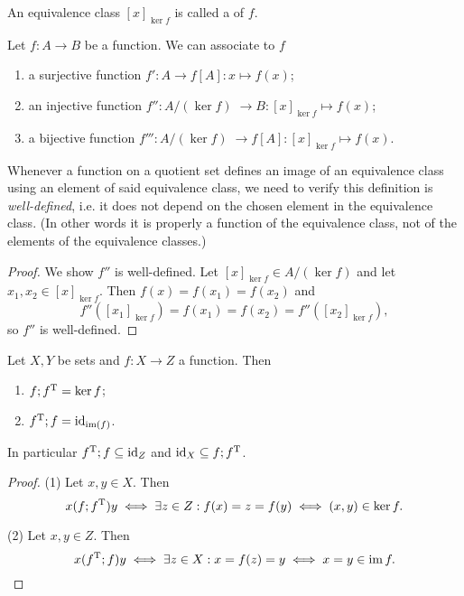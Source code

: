 \begin{definition}
An equivalence class $[x]_{\ker f}$ is called a  of $f$.
\end{definition}

\begin{proposition}
Let $f:A\to B$ be a function. We can associate to $f$
\begin{enumerate}
\item a surjective function $f': A\to f[A]: x\mapsto f(x)$;
\item an injective function $f'': A/(\ker f) \;\to B: [x]_{\ker f}\mapsto f(x)$;
\item a bijective function $f''': A/(\ker f) \;\to f[A]: [x]_{\ker f}\mapsto f(x)$.
\end{enumerate}
\end{proposition}
Whenever a function on a quotient set defines an image of an equivalence class using an element of said equivalence class, we need to verify this definition is \emph{well-defined}, i.e. it does not depend on the chosen element in the equivalence class. (In other words it is properly a function of the equivalence class, not of the elements of the equivalence classes.)
\begin{proof}
We show $f''$ is well-defined. Let $[x]_{\ker f}\in A/(\ker f)$ and let $x_1,x_2\in [x]_{\ker f}$. Then $f(x) = f(x_1) = f(x_2)$ and
\[ f''([x_1]_{\ker f}) = f(x_1) = f(x_2) = f''([x_2]_{\ker f}), \]
so $f''$ is well-defined.
\end{proof}


\begin{proposition}
Let $X,Y$ be sets and $f: X \to Z$ a function. Then
\begin{enumerate}
\item $f;f^{\mathrm{T}} = \ker f$;
\item $f^{\mathrm{T}};f = \operatorname{id}_{\operatorname{im}(f)}$.
\end{enumerate}
In particular $f^{\mathrm{T}};f \subseteq \operatorname{id}_Z$ and $\operatorname{id}_X \subseteq f;f^{\mathrm{T}}$.
\end{proposition}
\begin{proof}
(1) Let $x,y\in X$. Then
\[ x(f;f^{\mathrm{T}}) y \iff \exists z\in Z: f(x) = z = f(y) \iff (x,y)\in \ker f. \]

(2) Let $x,y\in Z$. Then
\[ x(f^{\mathrm{T}};f) y \iff \exists z\in X: x = f(z) = y \iff x=y \in \operatorname{im} f. \]
\end{proof}



